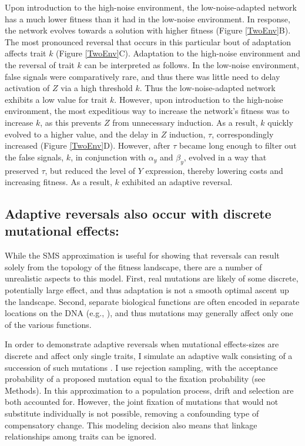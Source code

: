 \documentclass[dvips,12pt,twoside,titlepage]{article}
\begin{document}
Upon introduction to the high-noise environment, the low-noise-adapted network has a much lower fitness than it had in the low-noise environment. 
In response, the network evolves towards a solution with higher fitness (Figure \ref{TwoEnv}B). 
The most pronounced reversal that occurs in this particular bout of adaptation affects trait $k$ (Figure \ref{TwoEnv}C). 
Adaptation to the high-noise environment and the reversal of trait $k$ can be interpreted as follows. In the low-noise environment, false signals were comparatively rare, and thus there was little need to delay activation of $Z$ via a high threshold $k$. 
Thus the low-noise-adapted network exhibits a low value for trait $k$. 
However, upon introduction to the high-noise environment, the most expeditious way to increase the network's fitness was to increase $k$, as this prevents $Z$ from unnecessary induction. 
As a result, $k$ quickly evolved to a higher value, and the delay in $Z$ induction, $\tau$, correspondingly increased (Figure \ref{TwoEnv}D).
However, after $\tau$ became long enough to filter out the false signals, $k$, in conjunction with $\alpha_y$ and $\beta_y$, evolved in a way that preserved $\tau$, but reduced the level of $Y$ expression, thereby lowering costs and increasing fitness. As a result, $k$ exhibited an adaptive reversal.

\subsection*{Adaptive reversals also occur with discrete mutational effects:}

While the SMS approximation is useful for showing that reversals can result solely from the topology of the fitness landscape, there are a number of unrealistic aspects to this model. First, real mutations are likely of some discrete, potentially large effect, and thus adaptation is not a smooth optimal ascent up the landscape. Second, separate biological functions are often encoded in separate locations on the DNA (e.g., ), and thus mutations may generally affect only one of the various functions.

In order to demonstrate adaptive reversals when mutational effects-sizes are discrete and affect only single traits, I simulate an adaptive walk consisting of a succession of such mutations \cite{Gillespie:1994vr}. I use rejection sampling, with the acceptance probability of a proposed mutation equal to the fixation probability (see Methods). 
In this approximation to a population process, drift and selection are both accounted for.
However, the joint fixation of mutations that would not substitute individually is not possible, removing a confounding type of compensatory change.
This modeling decision also means that linkage relationships among traits can be ignored.
\end{document}
